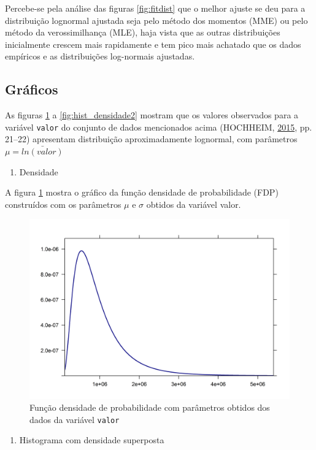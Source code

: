 \documentclass[a4paper]{article}
\providecommand{\tightlist}{%
  \setlength{\itemsep}{0pt}\setlength{\parskip}{0pt}}
\let\code=\texttt
\begin{document}
Percebe-se pela análise das figuras \ref{fig:fitdist} que o melhor
ajuste se deu para a distribuição lognormal ajustada seja pelo método
dos momentos (MME) ou pelo método da verossimilhança (MLE), haja vista
que as outras distribuições inicialmente crescem mais rapidamente e tem
pico mais achatado que os dados empíricos e as distribuições log-normais
ajustadas.

\subsection{Gráficos}\label{graficos}

As figuras \ref{fig:densidade} a \ref{fig:hist_densidade2} mostram que
os valores observados para a variável \code{valor} do conjunto de dados
mencionados acima (HOCHHEIM, \protect\hyperlink{ref-hochheim}{2015}, pp.
21--22) apresentam distribuição aproximadamente lognormal, com
parâmetros \(\mu = \bar{ln(valor)}\)

\newpage

\begin{enumerate}
\def\labelenumi{\alph{enumi}.}
\tightlist
\item
  Densidade
\end{enumerate}

A figura \ref{fig:densidade} mostra o gráfico da função densidade de
probabilidade (FDP) construídos com os parâmetros \(\mu\) e \(\sigma\)
obtidos da variável valor.

\begin{figure}[H]

{\centering \includegraphics[width=0.5\linewidth]{images/densidade-1} 

}

\caption{Função densidade de probabilidade com parâmetros obtidos dos dados da variável \code{valor}}\label{fig:densidade}
\end{figure}

\begin{enumerate}
\def\labelenumi{\alph{enumi}.}
\setcounter{enumi}{1}
\tightlist
\item
  Histograma com densidade superposta
\end{enumerate}
\end{document}
